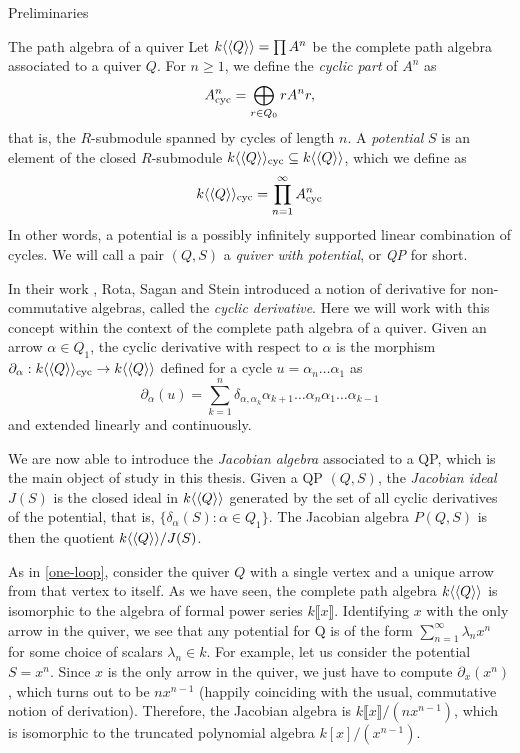 \begin{chapter}{Preliminaries}
\begin{section}{The path algebra of a quiver}
Let $k\langle\langle Q\rangle\rangle=\prod A^n$ be the complete path algebra associated to a quiver $Q$. For $n\geq 1$, we define the \emph{cyclic part} of $A^n$ as
\[
A^n_{\mathrm{cyc}} = \bigoplus_{r\in Q_0} rA^nr,
\]
that is, the $R$-submodule spanned by cycles of length $n$. A \emph{potential} $S$ is an element of the closed  $R$-submodule $k\langle\langle Q\rangle\rangle_{\mathrm{cyc}}\subseteq k\langle\langle Q\rangle\rangle$, which we define as
\[
k\langle\langle Q\rangle\rangle_{\mathrm{cyc}}=\prod_{n=1}^\infty A^n_{\mathrm{cyc}}
\]
In other words, a potential is a possibly infinitely supported linear combination of cycles. We will call a pair $(Q,S)$ a \emph{quiver with potential}, or \emph{QP} for short.

In their work \cite{RSS80}, Rota, Sagan and Stein introduced a notion of derivative for non-commutative algebras, called the \emph{cyclic derivative}. Here we will work with this concept within the context of the complete path algebra of a quiver. Given an arrow $\alpha\in Q_1$, the cyclic derivative with respect to $\alpha$ is the morphism $\partial_\alpha:k\langle\langle Q\rangle\rangle_{\mathrm{cyc}}\to k\langle\langle Q\rangle\rangle$ defined for a cycle $u=\alpha_n\dots\alpha_1$ as
\[
\partial_\alpha(u) = \sum_{k=1}^n \delta_{\alpha, \alpha_k}\alpha_{k+1}\dots\alpha_n\alpha_1\dots\alpha_{k-1}
\]
and extended linearly and continuously.

We are now able to introduce the \emph{Jacobian algebra} associated to a QP, which is the main object of study in this thesis. Given a QP $(Q,S)$, the \emph{Jacobian ideal} $J(S)$ is the closed ideal in $k\langle\langle Q\rangle\rangle$ generated by the set of all cyclic derivatives of the potential, that is, $\{\delta_\alpha(S) : \alpha\in Q_1\}$. The Jacobian algebra $P(Q,S)$ is then the quotient $k\langle\langle Q\rangle\rangle/J(S)$.

\begin{exmp} As in \ref{one-loop}, consider the quiver $Q$ with a single vertex and a unique arrow from that vertex to itself. As we have seen, the complete path algebra $k\langle\langle Q\rangle\rangle$ is isomorphic to the algebra of formal power series $k\llbracket x\rrbracket$. Identifying $x$ with the only arrow in the quiver, we see that any potential for Q is of the form $\sum_{n=1}^\infty \lambda_n x^n$ for some choice of scalars $\lambda_n\in k$. For example, let us consider the potential $S=x^n$. Since $x$ is the only arrow in the quiver, we just have to compute $\partial_x(x^n)$, which turns out to be $nx^{n-1}$ (happily coinciding with the usual, commutative notion of derivation). Therefore, the Jacobian algebra is $k\llbracket x\rrbracket/(nx^{n-1})$, which is isomorphic to the truncated polynomial algebra $k[x]/(x^{n-1})$.
\end{exmp}


\end{section}
\end{chapter}
